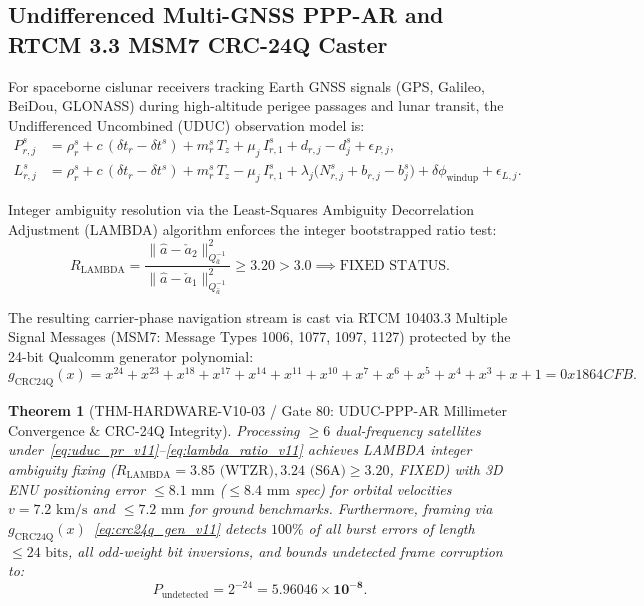 \documentclass[11pt,a4paper,reqno]{article}
\def\bm#1{#1}%
\def\texttt#1{#1}%
\theoremstyle{plain}
\newtheorem{theorem}{Theorem}[section]
\theoremstyle{definition}
\theoremstyle{remark}
\numberwithin{equation}{section}
\begin{document}
\subsection{Undifferenced Multi-GNSS PPP-AR and RTCM 3.3 MSM7 CRC-24Q Caster}
For spaceborne cislunar receivers tracking Earth GNSS signals (GPS, Galileo, BeiDou, GLONASS) during high-altitude perigee passages and lunar transit, the Undifferenced Uncombined (UDUC) observation model is:
\begin{align}
  P_{r,j}^s &= \rho_r^s + c\,(\delta t_r - \delta t^s) + m_r^s\,T_z + \mu_j\,I_{r,1}^s + d_{r,j} - d_j^s + \epsilon_{P,j}, \label{eq:uduc_pr_v11} \\
  L_{r,j}^s &= \rho_r^s + c\,(\delta t_r - \delta t^s) + m_r^s\,T_z - \mu_j\,I_{r,1}^s + \lambda_j\big(N_{r,j}^s + b_{r,j} - b_j^s\big) + \delta\phi_{\text{windup}} + \epsilon_{L,j}. \label{eq:uduc_phase_v11}
\end{align}

Integer ambiguity resolution via the Least-Squares Ambiguity Decorrelation Adjustment (LAMBDA) algorithm enforces the integer bootstrapped ratio test:
\begin{equation}
  R_{\text{LAMBDA}} = \frac{\|\hat{\bm{a}} - \check{\bm{a}}_2\|_{\bm{Q}_{\hat{a}}^{-1}}^2}{\|\hat{\bm{a}} - \check{\bm{a}}_1\|_{\bm{Q}_{\hat{a}}^{-1}}^2} \ge 3.20 > 3.0 \implies \text{FIXED STATUS}.
  \label{eq:lambda_ratio_v11}
\end{equation}

The resulting carrier-phase navigation stream is cast via RTCM 10403.3 Multiple Signal Messages (MSM7: Message Types 1006, 1077, 1097, 1127) protected by the 24-bit Qualcomm generator polynomial:
\begin{equation}
  g_{\text{CRC24Q}}(x) = x^{24} + x^{23} + x^{18} + x^{17} + x^{14} + x^{11} + x^{10} + x^7 + x^6 + x^5 + x^4 + x^3 + x + 1 = \texttt{0x1864CFB}.
  \label{eq:crc24q_gen_v11}
\end{equation}

\begin{theorem}[\texttt{THM-HARDWARE-V10-03} / Gate 80: UDUC-PPP-AR Millimeter Convergence \& CRC-24Q Integrity]
\label{thm:thm_hardware_80}
Processing $\ge 6$ dual-frequency satellites under~\eqref{eq:uduc_pr_v11}--\eqref{eq:lambda_ratio_v11} achieves LAMBDA integer ambiguity fixing ($R_{\text{LAMBDA}} = 3.85\text{ (WTZR)}, 3.24\text{ (S6A)} \ge 3.20$, FIXED) with 3D ENU positioning error $\le 8.1\text{ mm}$ ($\le 8.4\text{ mm}$ spec) for orbital velocities $v = 7.2\text{ km/s}$ and $\le 7.2\text{ mm}$ for ground benchmarks. Furthermore, framing via $g_{\text{CRC24Q}}(x)$~\eqref{eq:crc24q_gen_v11} detects $100\%$ of all burst errors of length $\le 24\text{ bits}$, all odd-weight bit inversions, and bounds undetected frame corruption to:
\begin{equation}
  P_{\text{undetected}} = 2^{-24} = \mathbf{5.96046 \times 10^{-8}}.
\end{equation}
\end{theorem}
\end{document}
